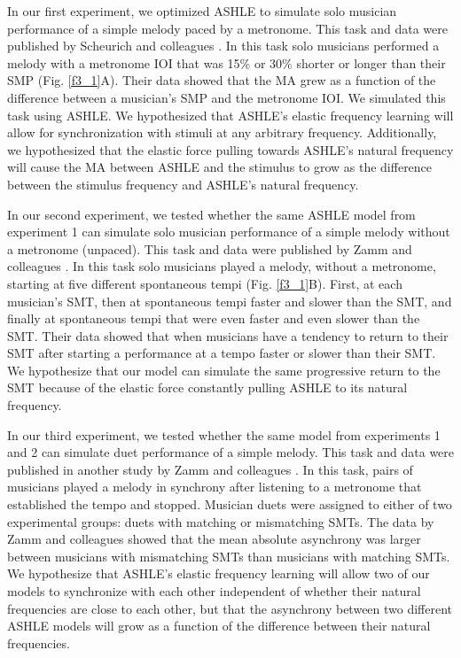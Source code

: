 \documentclass{report}
\begin{document}
In our first experiment, we optimized ASHLE to simulate solo musician performance of a simple melody paced by a metronome. This task and data were published by Scheurich and colleagues \cite{scheurich2018tapping}. In this task solo musicians performed a melody with a metronome IOI that was 15\% or 30\% shorter or longer than their SMP (Fig.{} \ref{f3_1}A). Their data showed that the MA grew as a function of the difference between a musician's SMP and the metronome IOI. We simulated this task using ASHLE. We hypothesized that ASHLE's elastic frequency learning will allow for synchronization with stimuli at any arbitrary frequency. Additionally, we hypothesized that the elastic force pulling towards ASHLE's natural frequency will cause the MA between ASHLE and the stimulus to grow as the difference between the stimulus frequency and ASHLE's natural frequency.

In our second experiment, we tested whether the same ASHLE model from experiment 1 can simulate solo musician performance of a simple melody without a metronome (unpaced). This task and data were published by Zamm and colleagues \cite{zamm2018musicians}. In this task solo musicians played a melody, without a metronome, starting at five different spontaneous tempi (Fig.{} \ref{f3_1}B). First, at each musician's SMT, then at spontaneous tempi faster and slower than the SMT, and finally at spontaneous tempi that were even faster and even slower than the SMT. Their data showed that when musicians have a tendency to return to their SMT after starting a performance at a tempo faster or slower than their SMT. We hypothesize that our model can simulate the same progressive return to the SMT because of the elastic force constantly pulling ASHLE to its natural frequency. 

In our third experiment, we tested whether the same model from experiments 1 and 2 can simulate duet performance of a simple melody. This task and data were published in another study by Zamm and colleagues \cite{zamm2016endogenous}. In this task, pairs of musicians played a melody in synchrony after listening to a metronome that established the tempo and stopped. Musician duets were assigned to either of two experimental groups: duets with matching or mismatching SMTs. The data by Zamm and colleagues \cite{zamm2016endogenous} showed that the mean absolute asynchrony was larger between musicians with mismatching SMTs than musicians with matching SMTs. We hypothesize that ASHLE's elastic frequency learning will allow two of our models to synchronize with each other independent of whether their natural frequencies are close to each other, but that the asynchrony between two different ASHLE models will grow as a function of the difference between their natural frequencies.
\end{document}
